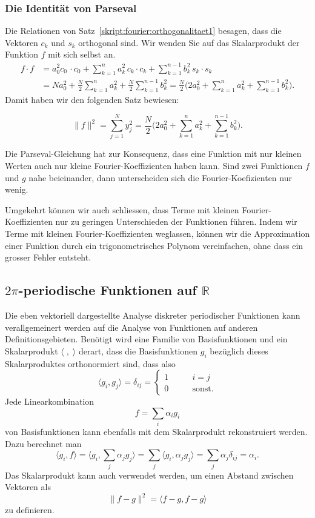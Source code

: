 \subsubsection{Die Identität von Parseval}
Die Relationen von
Satz~\ref{skript:fourier:orthogonalitaet1}
besagen, dass die Vektoren $c_k$ und $s_k$ orthogonal sind.
Wir wenden Sie auf das Skalarprodukt der Funktion $f$ mit sich selbst an.
\begin{align*}
f\cdot f
&=
a_0^2 c_0\,\cdot c_0
+
\sum_{k=1}^na_k^2 \,c_k\cdot c_k
+
\sum_{k=1}^{n-1} b_k^2\,s_k\cdot s_k
\\
&=
Na_0^2
+
\frac{N}2\sum_{k=1}^n a_k^2
+
\frac{N}2\sum_{k=1}^{n-1} b_k^2
=
\frac{N}2
\biggl(
2a_0^2
+
\sum_{k=1}^n a_k^2
+
\sum_{k=1}^{n-1} b_k^2
\biggr).
\end{align*}
Damit haben wir den folgenden Satz bewiesen:
\begin{satz}[Parseval]
\[
\|f\|^2
=
\sum_{j=1}^N y_j^2
=
\frac{N}2
\biggl(
2a_0^2
+
\sum_{k=1}^n a_k^2
+
\sum_{k=1}^{n-1} b_k^2
\biggr).
\]
\end{satz}
%
Die Parseval-Gleichung hat zur Konsequenz, dass eine Funktion mit nur
kleinen Werten auch nur kleine Fourier-Koeffizienten haben kann.
Sind zwei Funktionen $f$ und $g$ nahe beieinander, dann unterscheiden
sich die Fourier-Koefizienten nur wenig.

Umgekehrt können wir auch schliessen, dass Terme mit kleinen
Fourier-Koeffizienten nur zu geringen Unterschieden der Funktionen
führen.
Indem wir Terme mit kleinen Fourier-Koeffizienten weglassen, 
können wir die Approximation einer Funktion durch ein trigonometrisches
Polynom vereinfachen, ohne dass ein grosser Fehler entsteht.

\subsection{$2\pi$-periodische Funktionen auf $\mathbb R$\label{subsection:fourier:stetig}}
Die eben vektoriell dargestellte Analyse diskreter periodischer Funktionen 
kann verallgemeinert werden auf die Analyse von Funktionen auf
anderen Definitionsgebieten.
Benötigt wird eine Familie von Basisfunktionen und ein Skalarprodukt
$\langle\;,\;\rangle$ derart, dass die Basisfunktionen $g_i$ bezüglich
dieses Skalarproduktes orthonormiert sind, dass also
\[
\langle g_i,g_j\rangle
=
\delta_{ij}
=
\begin{cases}
1&\qquad i=j\\
0&\qquad\text{sonst}.
\end{cases}
\]
Jede Linearkombination
\[
f = \sum_{i} \alpha_i g_i
\]
von Basisfunktionen kann ebenfalls mit dem Skalarprodukt rekonstruiert
werden.
Dazu berechnet man
\[
\langle g_i,f\rangle
=
\biggl\langle
g_i,\sum_j\alpha_jg_j
\biggr\rangle
=
\sum_j \langle g_i,\alpha_jg_j\rangle
=
\sum_j \alpha_j\delta_{ij}
=
\alpha_i.
\]
Das Skalarprodukt kann auch verwendet werden, um einen Abstand zwischen
Vektoren als
\[
\| f-g\|^2
=
\langle f-g,f-g\rangle
\]
zu definieren.

